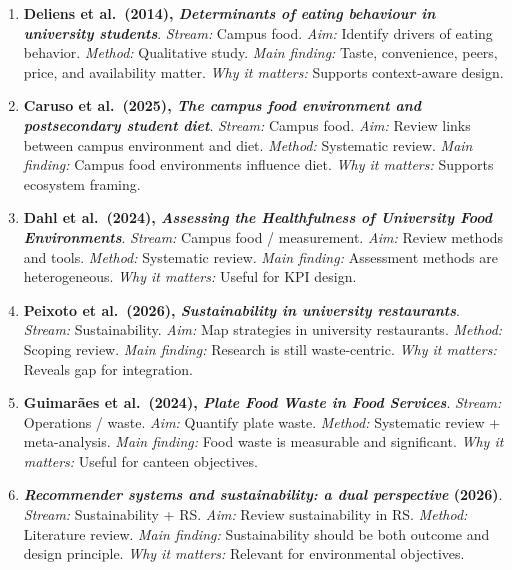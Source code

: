 \documentclass[
  letterpaper,
  DIV=11,
  numbers=noendperiod]{scrartcl}
\begin{document}
\begin{enumerate}
{{  tertiary education settings}}. \emph{Stream:} Campus food. \emph{Aim:}
  Review interventions. \emph{Method:} Systematic review. \emph{Main
  finding:} Tertiary food interventions can improve choices. \emph{Why
  it matters:} Strong campus evidence.
\item
  \textbf{Deliens et al.~(2014), \emph{Determinants of eating behaviour
  in university students}}. \emph{Stream:} Campus food. \emph{Aim:}
  Identify drivers of eating behavior. \emph{Method:} Qualitative study.
  \emph{Main finding:} Taste, convenience, peers, price, and
  availability matter. \emph{Why it matters:} Supports context-aware
  design.
\item
  \textbf{Caruso et al.~(2025), \emph{The campus food environment and
  postsecondary student diet}}. \emph{Stream:} Campus food. \emph{Aim:}
  Review links between campus environment and diet. \emph{Method:}
  Systematic review. \emph{Main finding:} Campus food environments
  influence diet. \emph{Why it matters:} Supports ecosystem framing.
\item
  \textbf{Dahl et al.~(2024), \emph{Assessing the Healthfulness of
  University Food Environments}}. \emph{Stream:} Campus food /
  measurement. \emph{Aim:} Review methods and tools. \emph{Method:}
  Systematic review. \emph{Main finding:} Assessment methods are
  heterogeneous. \emph{Why it matters:} Useful for KPI design.
\item
  \textbf{Peixoto et al.~(2026), \emph{Sustainability in university
  restaurants}}. \emph{Stream:} Sustainability. \emph{Aim:} Map
  strategies in university restaurants. \emph{Method:} Scoping review.
  \emph{Main finding:} Research is still waste-centric. \emph{Why it
  matters:} Reveals gap for integration.
\item
  \textbf{Guimarães et al.~(2024), \emph{Plate Food Waste in Food
  Services}}. \emph{Stream:} Operations / waste. \emph{Aim:} Quantify
  plate waste. \emph{Method:} Systematic review + meta-analysis.
  \emph{Main finding:} Food waste is measurable and significant.
  \emph{Why it matters:} Useful for canteen objectives.
\item
  \textbf{\emph{Recommender systems and sustainability: a dual
  perspective} (2026)}. \emph{Stream:} Sustainability + RS. \emph{Aim:}
  Review sustainability in RS. \emph{Method:} Literature review.
  \emph{Main finding:} Sustainability should be both outcome and design
  principle. \emph{Why it matters:} Relevant for environmental
  objectives.
\end{enumerate}
\end{document}
